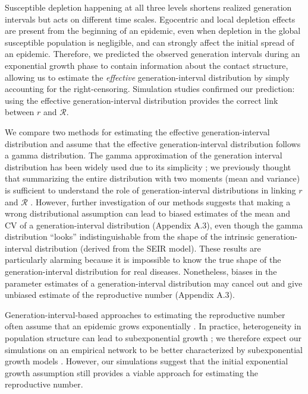 \documentclass[12pt]{article}
\newcommand{\RR}{\ensuremath{{\mathcal R}}}
\begin{document}
Susceptible depletion happening at all three levels shortens realized generation intervals but acts on different time scales.
Egocentric and local depletion effects are present from the beginning of an epidemic, even when depletion in the global susceptible population is negligible, and can strongly affect the initial spread of an epidemic.
Therefore, we predicted the observed generation intervals during an exponential growth phase to contain information about the contact structure, allowing us to estimate the \emph{effective} generation-interval distribution by simply accounting for the right-censoring.
Simulation studies confirmed our prediction: using the effective generation-interval distribution provides the correct link between $r$ and $\RR$.

We compare two methods for estimating the effective generation-interval distribution and assume that the effective generation-interval distribution follows a gamma distribution.
The gamma approximation of the generation interval distribution has been widely used due to its simplicity \citep{mcbryde2009early, nishiura2009transmission, roberts2011early, trichereau2012estimation, nishiura2015theoretical};
we previously thought that summarizing the entire distribution with two moments (mean and variance) is sufficient to understand the role of generation-interval distributions in linking $r$ and $\RR$ \citep{park2019practical}.
However, further investigation of our methods suggests that making a wrong distributional assumption can lead to biased estimates of the mean and CV of a generation-interval distribution (Appendix A.3), even though the gamma distribution ``looks'' indistinguishable from the shape of the intrinsic generation-interval distribution (derived from the SEIR model).
These results are particularly alarming because it is impossible to know the true shape of the generation-interval distribution for real diseases.
Nonetheless, biases in the parameter estimates of a generation-interval distribution may cancel out and give unbiased estimate of the reproductive number (Appendix A.3).

Generation-interval-based approaches to estimating the reproductive number often assume that an epidemic grows exponentially \citep{wearing2005appropriate, wallinga2007generation, roberts2007model, park2019practical}.
In practice, heterogeneity in population structure can lead to subexponential growth \citep{szendroi2004polynomial, chowell2015western, chowell2016growing, chowell2016characterizing, kiskowski2016modeling, viboud2016generalized};
we therefore expect our simulations on an empirical network to be better characterized by subexponential growth models \citep{viboud2016generalized}.
However, our simulations suggest that the initial exponential growth assumption still provides a viable approach for estimating the reproductive number.
\end{document}
